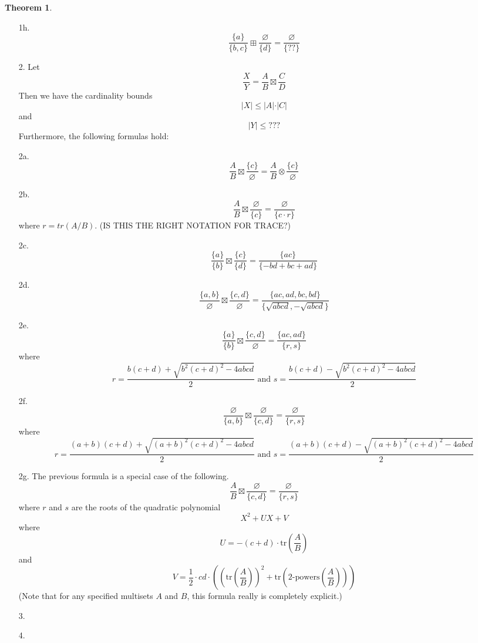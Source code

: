 \documentclass[a4paper]{article}
\theoremstyle{definition}
\newtheorem{theorem}{Theorem}[section]
\theoremstyle{remark}
\newcommand{\powers}[1]{{#1}\text{-powers}}
\newcommand{\tr}{\mathrm{tr}}
\begin{document}
\begin{theorem}
\begin{itemize}
\item[1h.] $$\frac{ \{a \}  }{\{ b,c \} } \boxplus \frac{\varnothing}{ \{  d \} } = \frac{ \varnothing  }{ \{ ?? \} }$$


\item[2.] Let $$\frac{X}{Y} = \frac{A}{B} \boxtimes \frac{C}{D}$$
Then we have the cardinality bounds
$$ \vert X \vert \leq \vert A \vert \cdot \vert C \vert   $$ 
and 
$$  \vert Y \vert \leq ???  $$
Furthermore, the following formulas hold:

\item[2a.] $$\frac{ A }{ B } \boxtimes \frac{\{ c \}}{ \varnothing }=\frac{A }{ B } \otimes \frac{\{ c \}}{ \varnothing }$$

\item[2b.] $$\frac{A }{ B } \boxtimes \frac{ \varnothing }{\{ c \}} = \frac{\varnothing}{\{c \cdot r\}}$$
where $r = tr(A/B)$. (IS THIS THE RIGHT NOTATION FOR TRACE?)

\item[2c.] $$\frac{\{a\}}{\{b\}} \boxtimes \frac{\{c\}}{\{d\}} = \frac{\{ac\}}{\{-bd+bc+ad\}}$$

\item[2d.] $$\frac{\{a,b\}}{\varnothing} \boxtimes \frac{\{c,d\}}{\varnothing} = \frac{\{ac,ad,bc,bd\}}{\{\sqrt{abcd}, -\sqrt{abcd}\}}$$


\item[2e.] $$\frac{\{a\}}{\{b\}} \boxtimes \frac{\{c,d\}}{\varnothing} = \frac{\{ac,ad\}}{\{r, s\}}$$
where 
$$r = \frac{b(c+d) + \sqrt{b^2 (c+d)^2 - 4abcd}}{2} \text{\ and\ } s = \frac{b(c+d) - \sqrt{b^2 (c+d)^2 - 4abcd}}{2}$$


\item[2f.] $$\frac{\varnothing}{\{a, b\}} \boxtimes \frac{\varnothing}{\{c,d\}} = \frac{\varnothing}{\{r, s\}}$$
where 
$$r = \frac{(a+b)(c+d) + \sqrt{(a+b)^2 (c+d)^2 - 4abcd}}{2} \text{\ and\ } s = \frac{(a+b)(c+d) - \sqrt{(a+b)^2 (c+d)^2 - 4abcd}}{2}$$

\item[2g.] The previous formula is a special case of the following.
$$\frac{A}{B} \boxtimes \frac{\varnothing}{\{c,d\}} = \frac{\varnothing}{\{r, s\}}$$
where $r$ and $s$ are the roots of the quadratic polynomial
$$ X^2 + UX + V   $$   
where
$$ U = -(c+d) \cdot \tr \left( \frac{A}{B}  \right)   $$
and
$$ V = \frac{1}{2}\cdot cd \cdot \left (  \left( \tr \left( \frac{A}{B}  \right) \right)^2    + \tr \left(   \powers{2} \left(  \frac{A}{B}  \right)   \right)   \right) $$
(Note that for any specified multisets $A$ and $B$, this formula really is completely explicit.)

\item[3.] 



\item[4.] 

\end{itemize}



\end{theorem}
\end{document}

